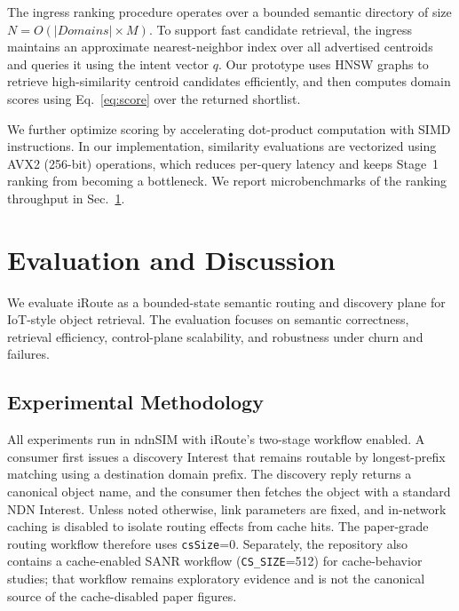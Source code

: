 \documentclass[journal]{IEEEtran}
\newcommand{\sysname}{iRoute}
\begin{document}
The ingress ranking procedure operates over a bounded semantic directory of size $N = O(|Domains| \times M)$.
To support fast candidate retrieval, the ingress maintains an approximate nearest-neighbor index over all advertised centroids and queries it using the intent vector $q$.
Our prototype uses HNSW graphs to retrieve high-similarity centroid candidates efficiently, and then computes domain scores using Eq.~\ref{eq:score} over the returned shortlist.

We further optimize scoring by accelerating dot-product computation with SIMD instructions.
In our implementation, similarity evaluations are vectorized using AVX2 (256-bit) operations, which reduces per-query latency and keeps Stage~1 ranking from becoming a bottleneck.
We report microbenchmarks of the ranking throughput in Sec.~\ref{sec:eval}.


\section{Evaluation and Discussion}
\label{sec:eval}

We evaluate \sysname{} as a bounded-state semantic routing and discovery plane for IoT-style object retrieval.
The evaluation focuses on semantic correctness, retrieval efficiency, control-plane scalability, and robustness under churn and failures.

\subsection{Experimental Methodology}
\label{sec:eval_setup}

All experiments run in ndnSIM with \sysname{}'s two-stage workflow enabled.
A consumer first issues a discovery Interest that remains routable by longest-prefix matching using a destination domain prefix.
The discovery reply returns a canonical object name, and the consumer then fetches the object with a standard NDN Interest.
Unless noted otherwise, link parameters are fixed, and in-network caching is disabled to isolate routing effects from cache hits.
The paper-grade routing workflow therefore uses \texttt{csSize}=0.
Separately, the repository also contains a cache-enabled SANR workflow (\texttt{CS\_SIZE}=512) for cache-behavior studies; that workflow remains exploratory evidence and is not the canonical source of the cache-disabled paper figures.
\end{document}
